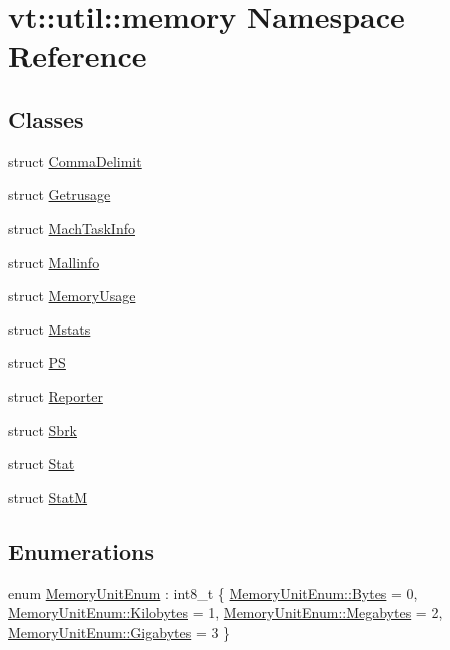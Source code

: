 \hypertarget{namespacevt_1_1util_1_1memory}{}\section{vt\+:\+:util\+:\+:memory Namespace Reference}
\label{namespacevt_1_1util_1_1memory}
\subsection*{Classes}
\begin{DoxyCompactItemize}
\item 
struct \hyperlink{structvt_1_1util_1_1memory_1_1_comma_delimit}{Comma\+Delimit}
\item 
struct \hyperlink{structvt_1_1util_1_1memory_1_1_getrusage}{Getrusage}
\item 
struct \hyperlink{structvt_1_1util_1_1memory_1_1_mach_task_info}{Mach\+Task\+Info}
\item 
struct \hyperlink{structvt_1_1util_1_1memory_1_1_mallinfo}{Mallinfo}
\item 
struct \hyperlink{structvt_1_1util_1_1memory_1_1_memory_usage}{Memory\+Usage}
\item 
struct \hyperlink{structvt_1_1util_1_1memory_1_1_mstats}{Mstats}
\item 
struct \hyperlink{structvt_1_1util_1_1memory_1_1_p_s}{PS}
\item 
struct \hyperlink{structvt_1_1util_1_1memory_1_1_reporter}{Reporter}
\item 
struct \hyperlink{structvt_1_1util_1_1memory_1_1_sbrk}{Sbrk}
\item 
struct \hyperlink{structvt_1_1util_1_1memory_1_1_stat}{Stat}
\item 
struct \hyperlink{structvt_1_1util_1_1memory_1_1_stat_m}{StatM}
\end{DoxyCompactItemize}
\subsection*{Enumerations}
\begin{DoxyCompactItemize}
\item 
enum \hyperlink{namespacevt_1_1util_1_1memory_a64df3d84293b34009f78e2a1db2f9bb6}{Memory\+Unit\+Enum} \+: int8\+\_\+t \{ \hyperlink{namespacevt_1_1util_1_1memory_a64df3d84293b34009f78e2a1db2f9bb6a600e754f49b68aa0fc90a9cd64eb7051}{Memory\+Unit\+Enum\+::\+Bytes} = 0, 
\hyperlink{namespacevt_1_1util_1_1memory_a64df3d84293b34009f78e2a1db2f9bb6aa3a6c675a174320497f3bed7e8dc3329}{Memory\+Unit\+Enum\+::\+Kilobytes} = 1, 
\hyperlink{namespacevt_1_1util_1_1memory_a64df3d84293b34009f78e2a1db2f9bb6a2276a1b157f2813f3b65d04c0b1c56f6}{Memory\+Unit\+Enum\+::\+Megabytes} = 2, 
\hyperlink{namespacevt_1_1util_1_1memory_a64df3d84293b34009f78e2a1db2f9bb6af6f7ad0fd5914138fb449b9011c8de7a}{Memory\+Unit\+Enum\+::\+Gigabytes} = 3
 \}
\end{DoxyCompactItemize}

